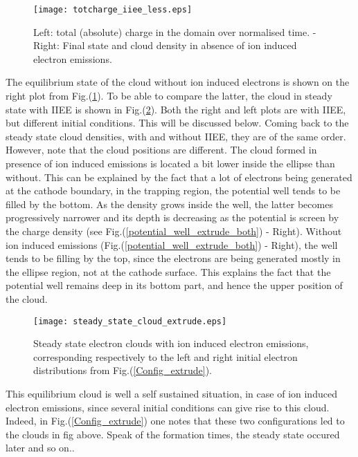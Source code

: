 \begin{figure}[h!]
\centering
	\texttt{[image: totcharge\_iiee\_less.eps]}
	\caption{\label{totcharge_iiee_less} Left: total (absolute) charge in the domain over normalised time. - Right: Final state and cloud density in absence of ion induced electron emissions.}
\end{figure}

\noindent The equilibrium state of the cloud without ion induced electrons is shown on the right plot from Fig.(\ref{totcharge_iiee_less}). To be able to compare the latter, the cloud in steady state with IIEE is shown in Fig.(\ref{steady_state_cloud_extrude}). Both the right and left plots are with IIEE, but different initial conditions. This will be discussed below. Coming back to the steady state cloud densities, with and without IIEE, they are of the same order. However, note that the cloud positions are different. The cloud formed in presence of ion induced emissions is located a bit lower inside the ellipse than without. This can be explained by the fact that a lot of electrons being generated at the cathode boundary, in the trapping region, the potential well tends to be filled by the bottom. As the density grows inside the well, the latter becomes progressively narrower and its depth is decreasing as the potential is screen by the charge density (see Fig.(\ref{potential_well_extrude_both}) - Right). Without ion induced emissions (Fig.(\ref{potential_well_extrude_both}) - Right), the well tends to be filling by the top, since the electrons are being generated mostly in the ellipse region, not at the cathode surface. This explains the fact that the potential well remains deep in its bottom part, and hence the upper position of the cloud.\\

\begin{figure}[h!]
\centering
	\texttt{[image: steady\_state\_cloud\_extrude.eps]}
	\caption{\label{steady_state_cloud_extrude} Steady state electron clouds with ion induced electron emissions, corresponding respectively to the left and right initial electron distributions from Fig.(\ref{Config_extrude}).}
\end{figure}

This equilibrium cloud is well a self sustained situation, in case of ion induced electron emissions, since several initial conditions can give rise to this cloud. Indeed, in Fig.(\ref{Config_extrude}) one notes that these two configurations led to the clouds in fig above. Speak of the formation times, the steady state occured later and so on.. 


